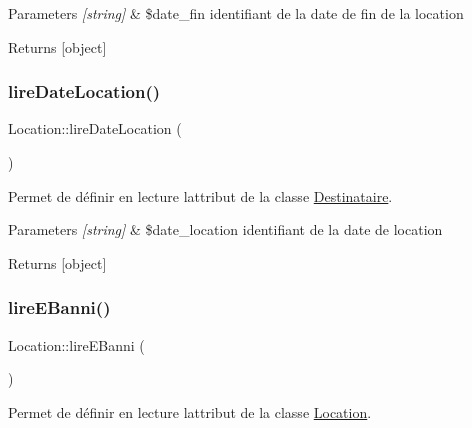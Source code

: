 \begin{DoxyParams}{Parameters}
{\em \mbox{[}string\mbox{]}} & \$date\+\_\+fin identifiant de la date de fin de la location \\
\hline
\end{DoxyParams}
\begin{DoxyReturn}{Returns}
\mbox{[}object\mbox{]} 
\end{DoxyReturn}
\mbox{\label{class_location_a5f55b6cf4473133663917708b5b80d12}} 
\subsubsection{\texorpdfstring{lire\+Date\+Location()}{lireDateLocation()}}
{\footnotesize\ttfamily Location\+::lire\+Date\+Location (\begin{DoxyParamCaption}{ }\end{DoxyParamCaption})}



Permet de définir en lecture l\textquotesingle{}attribut de la classe \hyperlink{class_destinataire}{Destinataire}. 


\begin{DoxyParams}{Parameters}
{\em \mbox{[}string\mbox{]}} & \$date\+\_\+location identifiant de la date de location \\
\hline
\end{DoxyParams}
\begin{DoxyReturn}{Returns}
\mbox{[}object\mbox{]} 
\end{DoxyReturn}
\mbox{\label{class_location_ab2595ab903c62276690d030b4b1d75e0}} 
\subsubsection{\texorpdfstring{lire\+E\+Banni()}{lireEBanni()}}
{\footnotesize\ttfamily Location\+::lire\+E\+Banni (\begin{DoxyParamCaption}{ }\end{DoxyParamCaption})}



Permet de définir en lecture l\textquotesingle{}attribut de la classe \hyperlink{class_location}{Location}. 


